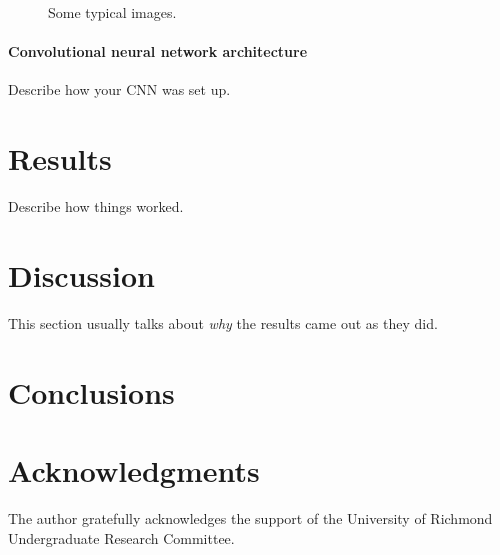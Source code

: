 \documentclass[11pt,twocolumn]{article}
\begin{document}
\begin{figure}
  \centering
  \hspace*{1em}
  \caption{Some typical images. \label{fig:TypicalImages}}
\end{figure}



  

\paragraph{Convolutional neural network architecture}

Describe how your CNN was set up.

\section{Results}
\label{sec:results}

Describe how things worked.

\section{Discussion}

This section usually talks about {\em why} the results came out
as they did.

\section{Conclusions}


\section{Acknowledgments}
The author gratefully acknowledges the support of
the University of Richmond Undergraduate Research Committee.

\newpage



\end{document}
